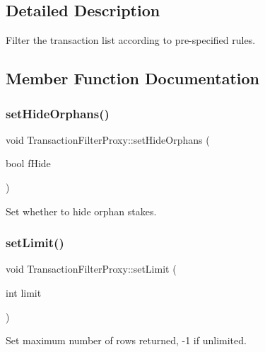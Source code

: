 \subsection{Detailed Description}
Filter the transaction list according to pre-\/specified rules. 

\subsection{Member Function Documentation}
\mbox{\label{class_transaction_filter_proxy_a3241c3e77288149621f888342434d8ae}} 
\subsubsection{\texorpdfstring{setHideOrphans()}{setHideOrphans()}}
{\footnotesize\ttfamily void Transaction\+Filter\+Proxy\+::set\+Hide\+Orphans (\begin{DoxyParamCaption}\item[{bool}]{f\+Hide }\end{DoxyParamCaption})}

Set whether to hide orphan stakes. \mbox{\label{class_transaction_filter_proxy_a3ec04a38573eb59b8f246f54658d2702}} 
\subsubsection{\texorpdfstring{setLimit()}{setLimit()}}
{\footnotesize\ttfamily void Transaction\+Filter\+Proxy\+::set\+Limit (\begin{DoxyParamCaption}\item[{int}]{limit }\end{DoxyParamCaption})}

Set maximum number of rows returned, -\/1 if unlimited. \mbox{\label{class_transaction_filter_proxy_aad1598cc4308eb08d8f617f08f62ece6}} 
